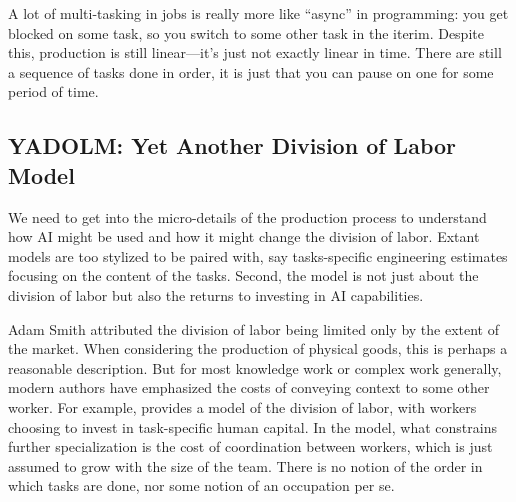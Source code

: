 \documentclass{article}
\theoremstyle{plain}
\theoremstyle{plain}
\begin{document}
A lot of multi-tasking in jobs is really more like ``async'' in programming: you get blocked on some task, so you switch to some other task in the iterim.
Despite this, production is still linear---it's just not exactly linear in time.
There are still a sequence of tasks done in order, it is just that you can pause on one for some period of time.



\subsection{YADOLM: Yet Another Division of Labor Model}
We need to get into the micro-details of the production process to understand how AI might be used and how it might change the division of labor. 
Extant models are too stylized to be paired with, say tasks-specific engineering estimates focusing on the content of the tasks.
Second, the model is not just about the division of labor but also the returns to investing in AI capabilities.

Adam Smith attributed the division of labor being limited only by the extent of the market. 
When considering the production of physical goods, this is perhaps a reasonable description. 
But for most knowledge work or complex work generally, modern authors have emphasized the costs of conveying context to some other worker.
For example, \cite{becker1992division} provides a model of the division of labor, with workers choosing to invest in task-specific human capital.
In the model, what constrains further specialization is the cost of coordination between workers, which is just assumed to grow with the size of the team.
There is no notion of the order in which tasks are done, nor some notion of an occupation per se. 
\end{document}
